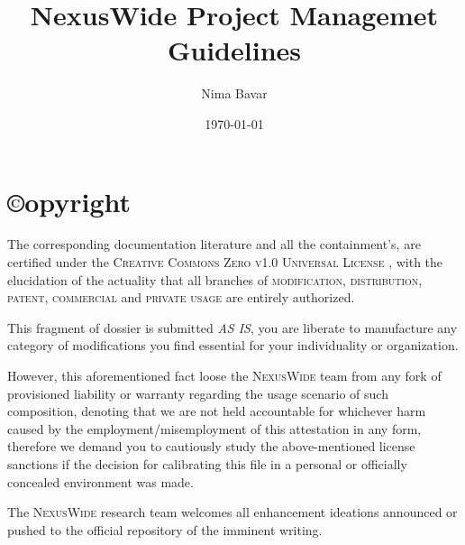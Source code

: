 \documentclass[13pt]{scrarticle}
\title{NexusWide Project Managemet Guidelines}
\author{Nima Bavar}
\date{\today}
\newcommand{\header}[1]{ \textsf{#1} \relax{}}
\newcommand{\important}[1]{\textit{#1}}
\newcommand{\name}[1]{{\textsc{#1}}}
\begin{document}
    \raggedright
    \pagestyle{fancy}

    \fancyhf{}

    \lhead{\leftmark}
    \rhead{\rightmark}
    \rfoot{\thepage}


    \thispagestyle{empty}
    \pagecolor{white}


    \thispagestyle{empty}
    \maketitle{}


    \newpage
    \thispagestyle{fancy}
    \setcounter{page}{2}

    \section*{\header{\copyright opyright}}
    \thispagestyle{empty}

    \raggedright
    The corresponding documentation literature and all the containment's, are certified under the \name{Creative Commons Zero v1.0 Universal License} ,
    with the elucidation of the actuality that all branches of \name{modification}, \name{distribution}, \name{patent}, \name{commercial } and \name{private usage } are entirely authorized.
    \newline

    This fragment of dossier is submitted \important{AS IS},
    you are liberate to manufacture any category of modifications you find essential for your individuality or organization.
    \newline

    However, this aforementioned fact loose the \name{NexusWide } team from any fork of provisioned liability or warranty regarding the usage scenario of such composition,
    denoting that we are not held accountable for whichever harm caused by the employment/misemployment of this attestation in any form,
    therefore we demand you to cautiously study the above-mentioned license sanctions if the decision for calibrating this file in a
    personal or officially concealed environment was made. \newline

    The \name{NexusWide } research team welcomes all enhancement ideations announced or pushed to the official repository of the imminent writing.
    \newline


    \newpage
    \thispagestyle{empty}
\end{document}
